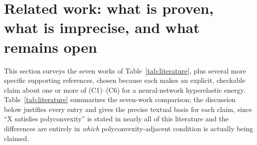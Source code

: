 \documentclass[10pt,a4paper]{article}
\begin{document}
\section{Related work: what is proven, what is imprecise, and what remains open}
\label{sec:related-work}
This section surveys the seven works of Table~\ref{tab:literature}, plus
several more specific supporting references, chosen because each makes an
explicit, checkable claim about one or more of (C1)--(C6) for a
neural-network hyperelastic energy.  Table~\ref{tab:literature} summarizes
the seven-work comparison; the discussion below justifies every entry and
gives the precise textual basis for each claim, since ``X satisfies polyconvexity''
is stated in nearly all of this literature and the differences are entirely
in \emph{which} polyconvexity-adjacent condition is actually being claimed.
\end{document}
